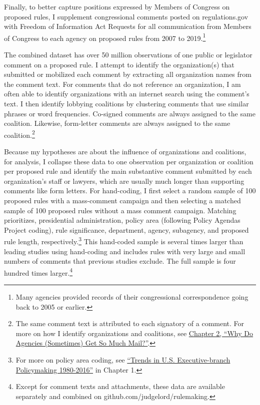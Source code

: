 \documentclass[
]{book}
\begin{document}
Finally, to better capture positions expressed by Members of Congress on proposed rules, I supplement congressional comments posted on regulations.gov with Freedom of Information Act Requests for all communication from Members of Congress to each agency on proposed rules from 2007 to 2019.\footnote{Many agencies provided records of their congressional correspondence going back to 2005 or earlier.}

The combined dataset has over 50 million observations of one public or legislator comment on a proposed rule. I attempt to identify the organization(s) that submitted or mobilized each comment by extracting all organization names from the comment text. For comments that do not reference an organization, I am often able to identify organizations with an internet search using the comment's text. I then identify lobbying coalitions by clustering comments that use similar phrases or word frequencies. Co-signed comments are always assigned to the same coalition. Likewise, form-letter comments are always assigned to the same coalition.\footnote{The same comment text is attributed to each signatory of a comment. For more on how I identify organizations and coalitions, see \href{https://judgelord.github.io/dissertation/whyMail.pdf}{Chapter 2, ``Why Do Agencies (Sometimes) Get So Much Mail?''}.}

Because my hypotheses are about the influence of organizations and coalitions, for analysis, I collapse these data to one observation per organization or coalition per proposed rule and identify the main substantive comment submitted by each organization's staff or lawyers, which are usually much longer than supporting comments like form letters. For hand-coding, I first select a random sample of 100 proposed rules with a mass-comment campaign and then selecting a matched sample of 100 proposed rules without a mass comment campaign. Matching prioritizes, presidential administration, policy area (following Policy Agendas Project coding), rule significance, department, agency, subagency, and proposed rule length, respectively.\footnote{For more on policy area coding, see \href{https://judgelord.github.io/dissertation/MacroRulemaking.pdf}{``Trends in U.S. Executive-branch Policymaking 1980-2016''} in Chapter 1.} This hand-coded sample is several times larger than leading studies using hand-coding and includes rules with very large and small numbers of comments that previous studies exclude. The full sample is four hundred times larger.\footnote{Except for comment texts and attachments, these data are available separately and combined on github.com/judgelord/rulemaking.}
\end{document}
